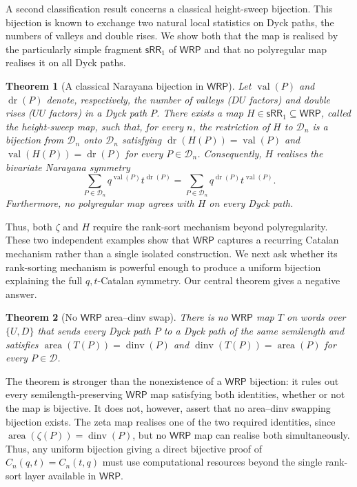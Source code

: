 \documentclass[11pt]{article}
\newtheorem{theorem}{Theorem}[section]
\theoremstyle{definition}
\newcommand{\D}{\mathcal D}
\newcommand{\WRP}{\mathsf{WRP}}
\newcommand{\SWR}{\mathsf{sRR}_1}
\newcommand{\area}{\operatorname{area}}
\newcommand{\dinv}{\operatorname{dinv}}
\newcommand{\val}{\operatorname{val}}
\newcommand{\dr}{\operatorname{dr}}
\begin{document}
A second classification result concerns a classical height-sweep bijection.
This bijection is known to exchange two natural local statistics on Dyck
paths, the numbers of valleys and double rises.  We show both that the map is
realised by the particularly simple fragment $\SWR$ of $\WRP$ and that no
polyregular map realises it on all Dyck paths.
\begin{theorem}[A classical Narayana bijection in $\WRP$]
\label{thm:intro-narayana-sweep}
Let $\val(P)$ and $\dr(P)$ denote, respectively, the number of valleys
($DU$ factors) and double rises ($UU$ factors) in a Dyck path $P$.
There exists a map $H\in\SWR\subseteq\WRP$, called the \emph{height-sweep
map}, such that, for every $n$, the restriction of $H$ to $\D_n$ is a
bijection from $\D_n$ onto $\D_n$ satisfying
$\dr(H(P))=\val(P)$ and $\val(H(P))=\dr(P)$ for every
$P\in\D_n$.
Consequently, $H$ realises the bivariate Narayana
symmetry
\[
   \sum_{P\in\D_n} q^{\val(P)}t^{\dr(P)}
   =
   \sum_{P\in\D_n} q^{\dr(P)}t^{\val(P)}.
\]
Furthermore, no polyregular map agrees with $H$ on every Dyck path.
\end{theorem}

Thus, both $\zeta$ and $H$ require the rank-sort mechanism beyond
polyregularity.  These two independent examples show that $\WRP$ captures a
recurring Catalan mechanism rather than a single isolated construction.  We
next ask whether its rank-sorting mechanism is powerful enough to produce a
uniform bijection explaining the full $q,t$-Catalan symmetry.  Our central
theorem gives a negative answer.
\begin{theorem}[No $\WRP$ area--dinv swap]
\label{thm:intro-no-swap}
There is no $\WRP$ map $T$ on words over $\{U,D\}$ that sends every Dyck path
$P$ to a Dyck path of the same semilength and satisfies
$\area(T(P))=\dinv(P)$ and $\dinv(T(P))=\area(P)$ for every $P\in\D$.
\end{theorem}

The theorem is stronger than the nonexistence of a $\WRP$ bijection: it rules
out every semilength-preserving $\WRP$ map satisfying both identities, whether
or not the map is bijective.  It does not, however, assert that no
area--dinv swapping bijection exists.  The zeta map realises one of the two
required identities, since $\area(\zeta(P))=\dinv(P)$, but no $\WRP$ map can
realise both simultaneously.  Thus, any uniform bijection giving a direct
bijective proof of $C_n(q,t)=C_n(t,q)$ must use computational resources beyond
the single rank-sort layer available in $\WRP$.
\end{document}
